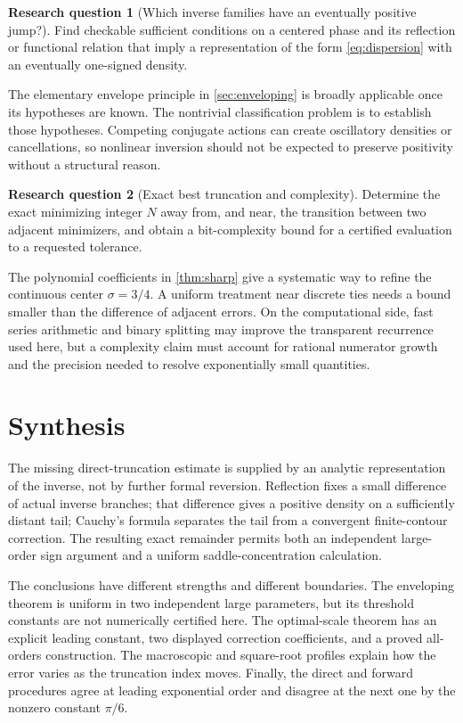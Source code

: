 \documentclass[11pt,a4paper]{article}
\theoremstyle{definition}
\newtheorem{problem}{Research question}
\numberwithin{equation}{section}
\begin{document}
\begin{problem}[Which inverse families have an eventually positive jump?]
Find checkable sufficient conditions on a centered phase and its
reflection or functional relation that imply a representation of the
form \eqref{eq:dispersion} with an eventually one-signed density.
\end{problem}
The elementary envelope principle in \cref{sec:enveloping} is broadly
applicable once its hypotheses are known. The nontrivial classification
problem is to establish those hypotheses. Competing conjugate actions
can create oscillatory densities or cancellations, so nonlinear inversion
should not be expected to preserve positivity without a structural reason.

\begin{problem}[Exact best truncation and complexity]
Determine the exact minimizing integer $N$ away from, and near, the
transition between two adjacent minimizers, and obtain a bit-complexity
bound for a certified evaluation to a requested tolerance.
\end{problem}
The polynomial coefficients in \cref{thm:sharp} give a systematic way
to refine the continuous center $\sigma=3/4$. A uniform treatment near
discrete ties needs a bound smaller than the difference of adjacent
errors. On the computational side, fast series arithmetic and binary
splitting may improve the transparent recurrence used here, but a
complexity claim must account for rational numerator growth and the
precision needed to resolve exponentially small quantities.

\section{Synthesis}
\label{sec:synthesis}

The missing direct-truncation estimate is supplied by an analytic
representation of the inverse, not by further formal reversion.
Reflection fixes a small difference of actual inverse branches;
that difference gives a positive density on a sufficiently distant tail;
Cauchy's formula separates the tail from a convergent finite-contour
correction. The resulting exact remainder permits both an independent
large-order sign argument and a uniform saddle-concentration calculation.

The conclusions have different strengths and different boundaries.
The enveloping theorem is uniform in two independent large parameters,
but its threshold constants are not numerically certified here. The
optimal-scale theorem has an explicit leading constant, two displayed
correction coefficients, and a proved all-orders construction. The
macroscopic and square-root profiles explain how the error varies as
the truncation index moves. Finally, the direct and forward procedures
agree at leading exponential order and disagree at the next one by the
nonzero constant $\pi/6$.
\end{document}
